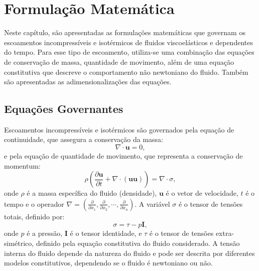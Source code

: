 \chapter[Formulação]{Formulação Matemática}
\label{Cap_FormulacaoMatematica}

Neste capítulo, são apresentadas as formulações matemáticas que governam os escoamentos incompressíveis e isotérmicos de fluidos viscoelásticos e dependentes do tempo. Para esse tipo de escoamento, utiliza-se uma combinação das equações de conservação de massa, quantidade de movimento, além de uma equação constitutiva que descreve o comportamento não newtoniano do fluido. Também são apresentadas as adimensionalizações das equações.

\section{Equações Governantes}\label{Sec:EquacoesGovernantes}
Escoamentos incompressíveis e isotérmicos são governados pela equação de continuidade, que assegura a conservação da massa:
\begin{equation}\label{eq_conservacao_massa}
    \nabla\cdot\mathbf{u} = 0,
\end{equation}
e pela equação de quantidade de movimento, que representa a conservação de momentum:
\begin{equation}\label{eq_conservacao_momentum}
    \rho \left( \frac{\partial \mathbf{u}}{\partial t} + \nabla \cdot (\mathbf{u} \mathbf{u}) \right) = \nabla \cdot \sigma,
\end{equation}
onde $\rho$ é a massa específica do fluido (densidade), $\mathbf{u}$ é o vetor de velocidade, $t$ é o tempo e o operador $\nabla = \left(\frac{\partial}{\partial x_{1}},\frac{\partial}{\partial x_{2}},\cdots,\frac{\partial}{\partial x_{n}}\right)$. A variável $\sigma$ é o tensor de tensões totais, definido por:
\begin{equation}\label{eq_tensoes_totais}
    \sigma = \tau - p \mathbf{I},
\end{equation}
onde $p$ é a pressão, $\mathbf{I}$ é o tensor identidade, e $\tau$ é o tensor de tensões extra-simétrico, definido pela equação constitutiva do fluido considerado. A tensão interna do fluido depende da natureza do fluido e pode ser descrita por diferentes modelos constitutivos, dependendo se o fluido é newtoniano ou não. 

